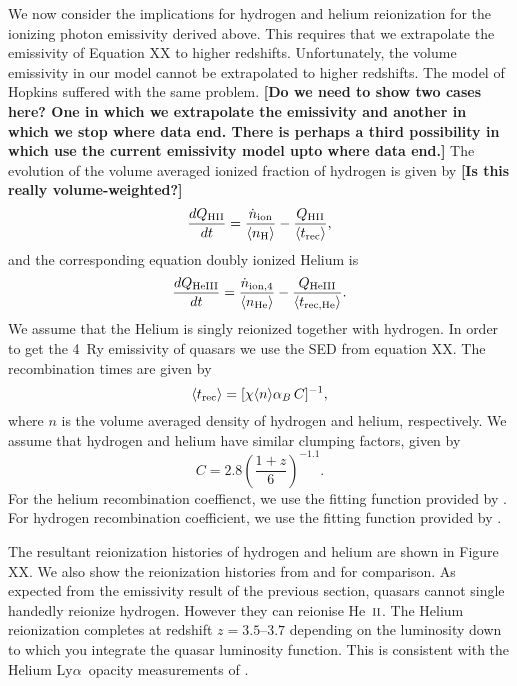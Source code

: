\documentclass[a4paper,fleqn,usenatbib]{mnras}
\def\lya{Ly$\alpha$~}
\newcommand{\gk}[1]{{\bf \color{notecolor} [#1]}}
\def\nH{{\rm H}}
\def\nHII{{\rm HII}}
\def\nHe{{\rm He}}
\def\nHeIII{{\rm HeIII}}
\def\HeII{\hbox{He~$\scriptstyle\rm II$}}
\begin{document}
We now consider the implications for hydrogen and helium reionization
for the ionizing photon emissivity derived above.  This requires that
we extrapolate the emissivity of Equation XX to higher redshifts.
Unfortunately, the volume emissivity in our model cannot be
extrapolated to higher redshifts.  The model of Hopkins suffered with
the same problem.  \gk{Do we need to show two cases here?  One in
  which we extrapolate the emissivity and another in which we stop
  where data end.  There is perhaps a third possibility in which use
  the current emissivity model upto where data end.}  The evolution of
the volume averaged ionized fraction of hydrogen is given by \gk{Is
  this really volume-weighted?}  \citep{2012ApJ...746..125H}
\begin{equation}
{dQ_\nHII\over dt}={\dot n_{\rm ion}\over \langle n_\nH \rangle} -{Q_\nHII\over
\langle t_{\rm rec}\rangle},
\label{eq:qdot}
\end{equation}
and the corresponding equation doubly ionized Helium is
\begin{equation}
{dQ_\nHeIII\over dt}={\dot n_{\rm ion,4}\over \langle n_\nHe \rangle} -{Q_\nHeIII\over
\langle t_{\rm rec,He}\rangle}.
\label{eq:qHedot}
\end{equation}
We assume that the Helium is singly reionized together with hydrogen.
In order to get the 4~Ry emissivity of quasars we use the SED from
equation XX.  The recombination times are given by
\begin{equation}
\langle t_{\rm rec}\rangle=[\chi \langle n\rangle \alpha_B\,C]^{-1},
\label{eq:trec}
\end{equation}
where $n$ is the volume averaged density of hydrogen and helium,
respectively.  We assume that hydrogen and helium have similar
clumping factors, given by \citep{2015ApJ...813L...8M}
\begin{equation}
  C = 2.8\left(\frac{1+z}{6}\right)^{-1.1}.
\end{equation}
For the helium recombination coeffienct, we use the fitting function
provided by \citet{1997MNRAS.292...27H}.  For hydrogen recombination
coefficient, we use the fitting function provided by
\citet{2011piim.book.....D}.

The resultant reionization histories of hydrogen and helium are shown
in Figure XX.  We also show the reionization histories from
\citep{2012ApJ...746..125H} and \citep{2015ApJ...813L...8M} for
comparison.  As expected from the emissivity result of the previous
section, quasars cannot single handedly reionize hydrogen.  However
they can reionise \HeII.  The Helium reionization completes at
redshift $z=3.5$--$3.7$ depending on the luminosity down to which you
integrate the quasar luminosity function.  This is consistent with the
Helium \lya opacity measurements of \citet{2016ApJ...825..144W}.
\end{document}
